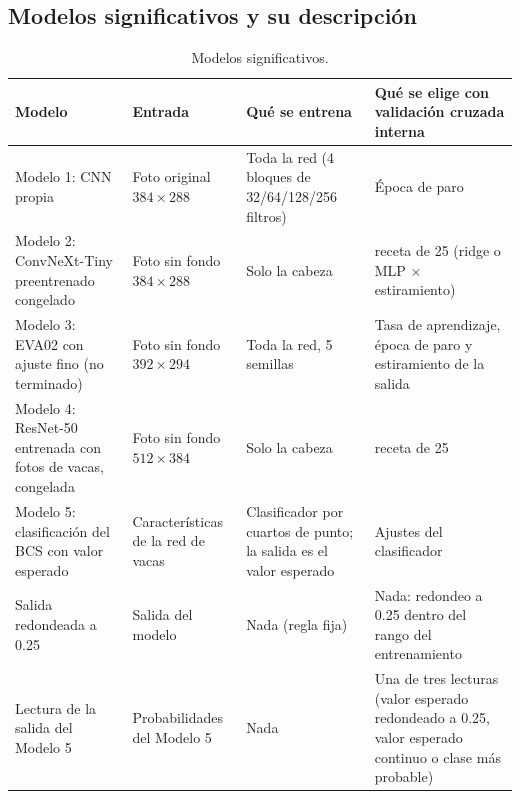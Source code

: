 \subsection{Modelos significativos y su descripción}

\begin{table}[H]
  \centering
  \small
  \caption{Modelos significativos.}
  \label{tab:modelos}
  \begin{tabularx}{\textwidth}{>{\raggedright\arraybackslash}p{}>{\raggedright\arraybackslash}p{}>{\raggedright\arraybackslash}X>{\raggedright\arraybackslash}X}
    \toprule
    Modelo & Entrada & Qué se entrena & Qué se elige con validación cruzada interna \\
    \midrule
    Modelo 1: CNN propia & Foto original $384\times288$ & Toda la red (4 bloques de 32/64/128/256 filtros) & Época de paro \\
    \addlinespace
    Modelo 2: ConvNeXt-Tiny preentrenado congelado & Foto sin fondo $384\times288$ & Solo la cabeza & 1 receta de 25 (ridge o MLP $\times$ estiramiento) \\
    \addlinespace
    Modelo 3: EVA02 con ajuste fino (no terminado) & Foto sin fondo $392\times294$ & Toda la red, 5 semillas & Tasa de aprendizaje, época de paro y estiramiento de la salida \\
    \addlinespace
    Modelo 4: ResNet-50 entrenada con fotos de vacas, congelada & Foto sin fondo $512\times384$ & Solo la cabeza & 1 receta de 25 \\
    \addlinespace
    Modelo 5: clasificación del BCS con valor esperado & Características de la red de vacas & Clasificador por cuartos de punto; la salida es el valor esperado & Ajustes del clasificador \\
    \addlinespace
    Salida redondeada a 0.25 & Salida del modelo & Nada (regla fija) & Nada: redondeo a 0.25 dentro del rango del entrenamiento \\
    \addlinespace
    Lectura de la salida del Modelo 5 & Probabilidades del Modelo 5 & Nada & Una de tres lecturas (valor esperado redondeado a 0.25, valor esperado continuo o clase más probable) \\
    \bottomrule
  \end{tabularx}
\end{table}

